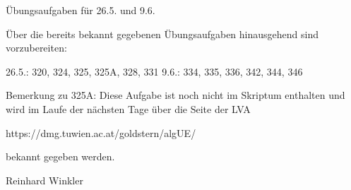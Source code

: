 Übungsaufgaben für 26.5. und 9.6.

Über die bereits bekannt gegebenen Übungsaufgaben hinausgehend sind vorzubereiten:

26.5.: 320, 324, 325, 325A, 328, 331
9.6.: 334, 335, 336, 342, 344, 346

Bemerkung zu 325A: Diese Aufgabe ist noch nicht im Skriptum enthalten und wird im Laufe der nächsten Tage über die Seite der LVA

https://dmg.tuwien.ac.at/goldstern/algUE/

bekannt gegeben werden.

Reinhard Winkler
